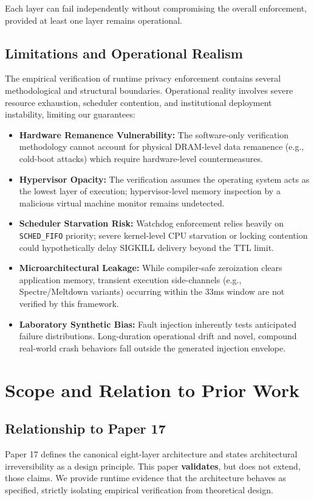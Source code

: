 \documentclass[conference]{IEEEtran}
\begin{document}
Each layer can fail independently without compromising the overall enforcement, provided at least one layer remains operational.

\subsection{Limitations and Operational Realism}
The empirical verification of runtime privacy enforcement contains several methodological and structural boundaries. Operational reality involves severe resource exhaustion, scheduler contention, and institutional deployment instability, limiting our guarantees:
\begin{itemize}
    \item \textbf{Hardware Remanence Vulnerability:} The software-only verification methodology cannot account for physical DRAM-level data remanence (e.g., cold-boot attacks) which require hardware-level countermeasures.
    \item \textbf{Hypervisor Opacity:} The verification assumes the operating system acts as the lowest layer of execution; hypervisor-level memory inspection by a malicious virtual machine monitor remains undetected.
    \item \textbf{Scheduler Starvation Risk:} Watchdog enforcement relies heavily on \texttt{SCHED\_FIFO} priority; severe kernel-level CPU starvation or locking contention could hypothetically delay SIGKILL delivery beyond the TTL limit.
    \item \textbf{Microarchitectural Leakage:} While compiler-safe zeroization clears application memory, transient execution side-channels (e.g., Spectre/Meltdown variants) occurring within the 33ms window are not verified by this framework.
    \item \textbf{Laboratory Synthetic Bias:} Fault injection inherently tests anticipated failure distributions. Long-duration operational drift and novel, compound real-world crash behaviors fall outside the generated injection envelope.
\end{itemize}

\section{Scope and Relation to Prior Work}

\subsection{Relationship to Paper 17}
Paper 17 \cite{b17} defines the canonical eight-layer architecture and states architectural irreversibility as a design principle. This paper \textbf{validates}, but does not extend, those claims. We provide runtime evidence that the architecture behaves as specified, strictly isolating empirical verification from theoretical design. 
\end{document}
